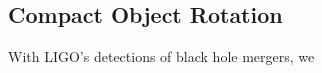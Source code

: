 {\color{orange}

\subsection{Compact Object Rotation}

With LIGO's detections of black hole mergers, we 

}